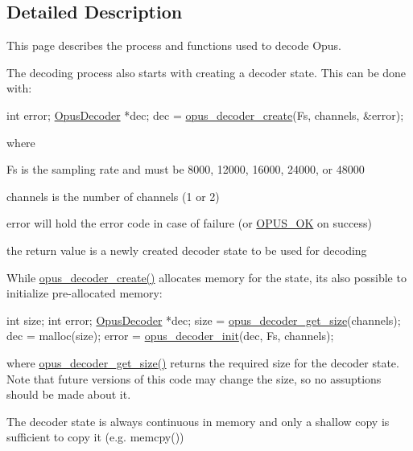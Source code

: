 \subsection{Detailed Description}
This page describes the process and functions used to decode Opus. 

The decoding process also starts with creating a decoder state. This can be done with\+: 
\begin{DoxyCode}
\textcolor{keywordtype}{int}          error;
\hyperlink{group__opus__decoder_ga401d8579958d36094715a6b90cd159a6}{OpusDecoder} *dec;
dec = \hyperlink{group__opus__decoder_ga753f6fe0b699c81cfd47d70c8e15a0bd}{opus\_decoder\_create}(Fs, channels, &error);
\end{DoxyCode}
 where \begin{DoxyItemize}
\item Fs is the sampling rate and must be 8000, 12000, 16000, 24000, or 48000 \item channels is the number of channels (1 or 2) \item error will hold the error code in case of failure (or \hyperlink{group__opus__errorcodes_gaa44cf8a185e1b5cb940ef63eb4f02d21}{O\+P\+U\+S\+\_\+\+OK} on success) \item the return value is a newly created decoder state to be used for decoding\end{DoxyItemize}
While \hyperlink{group__opus__decoder_ga753f6fe0b699c81cfd47d70c8e15a0bd}{opus\+\_\+decoder\+\_\+create()} allocates memory for the state, it\textquotesingle{}s also possible to initialize pre-\/allocated memory\+: 
\begin{DoxyCode}
\textcolor{keywordtype}{int}          size;
\textcolor{keywordtype}{int}          error;
\hyperlink{group__opus__decoder_ga401d8579958d36094715a6b90cd159a6}{OpusDecoder} *dec;
size = \hyperlink{group__opus__decoder_gac918415b2ee21add75b7f867ce235011}{opus\_decoder\_get\_size}(channels);
dec = malloc(size);
error = \hyperlink{group__opus__decoder_ga939156d1f561c4273d5c62fa9c235a01}{opus\_decoder\_init}(dec, Fs, channels);
\end{DoxyCode}
 where \hyperlink{group__opus__decoder_gac918415b2ee21add75b7f867ce235011}{opus\+\_\+decoder\+\_\+get\+\_\+size()} returns the required size for the decoder state. Note that future versions of this code may change the size, so no assuptions should be made about it.

The decoder state is always continuous in memory and only a shallow copy is sufficient to copy it (e.\+g. memcpy())

